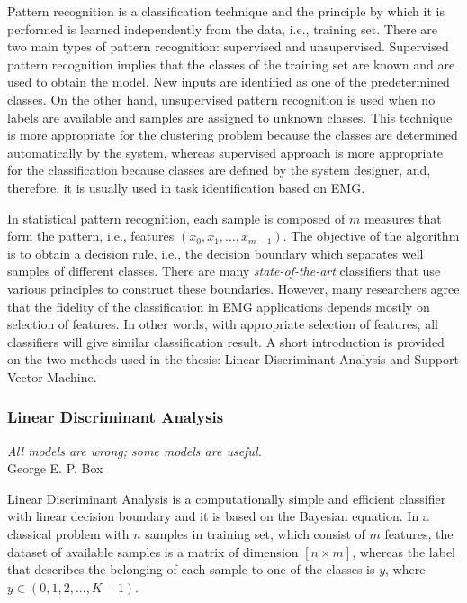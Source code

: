 Pattern recognition is a classification technique and the principle by which it is performed is learned independently from the data, i.e., training set. There are two main types of pattern recognition: supervised and unsupervised. Supervised pattern recognition implies that the classes of the training set are known and are used to obtain the model. New inputs are identified as one of the predetermined classes. On the other hand, unsupervised pattern recognition is used when no labels are available and samples are assigned to unknown classes. This technique is more appropriate for the clustering problem because the classes are determined automatically by the system, whereas supervised approach is more appropriate for the classification because classes are defined by the system designer, and, therefore, it is usually used in task identification based on EMG.

In statistical pattern recognition, each sample is composed of $m$ measures that form the pattern, i.e., features $(x_0, x_1, \dots, x_{m-1})$. The objective of the algorithm is to obtain a decision rule, i.e., the decision boundary which separates well samples of different classes. There are many \emph{state-of-the-art} classifiers that use various principles to construct these boundaries. However, many researchers agree that the fidelity of the classification in EMG applications depends mostly on selection of features. In other words, with appropriate selection of features, all classifiers will give similar classification result. A short introduction is provided on the two methods used in the thesis: Linear Discriminant Analysis and Support Vector Machine.


\subsubsection{Linear Discriminant Analysis}

\begin{myquote}
\begin{flushright}
\textit{All models are wrong; some models are useful.} \\George E. P. Box
\end{flushright}
\end{myquote}

Linear Discriminant Analysis is a computationally simple and efficient classifier with linear decision boundary and it is based on the Bayesian equation. In a classical problem with $n$ samples in training set, which consist of $m$ features, the dataset of available samples is a matrix of dimension $[n \times m]$, whereas the label that describes the belonging of each sample to one of the classes is $y$, where $y \in (0,1,2,...,K-1)$.

